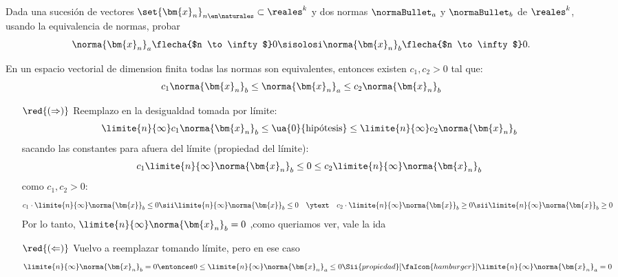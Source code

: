 \begin{enunciado}{\ejercicio}
  Dada una sucesión de vectores $\set{\bm{x}_n}_{n \en \naturales} \subset \reales^k$ y dos normas $\normaBullet_a$ y $\normaBullet_b$ de
  $\reales^k$, usando la equivalencia de normas, probar
  $$
    \norma{\bm{x}_n}_a \flecha{$n \to \infty$} 0
    \sisolosi
    \norma{\bm{x}_n}_b \flecha{$n \to \infty$} 0.
  $$
\end{enunciado}

\medskip

En un espacio vectorial de dimension finita todas las normas son equivalentes, entonces existen $c_1,c_2 > 0$ tal que:
$$
  c_1 \norma{\bm{x}_n}_b
  \leq
  \norma{\bm{x}_n}_a
  \leq
  c_2 \norma{\bm{x}_n}_b
$$

\begin{enumerate}
  \item[$\red{(\Rightarrow)}$]
        Reemplazo en la desigualdad tomada por límite:
        $$
          \limite{n}{\infty} c_1\norma{\bm{x}_n}_b \leq \ua{0}{\text{hipótesis}}
          \leq
          \limite{n}{\infty}  c_2\norma{\bm{x}_n}_b
        $$
        sacando las constantes para afuera del límite (propiedad del límite):
        $$
          c_1 \limite{n}{\infty} \norma{\bm{x}_n}_b \leq 0 \leq  c_2 \limite{n}{\infty} \norma{\bm{x}_n}_b
        $$
        como  $c_1, c_2 > 0$:
        $$
          c_1 \cdot \limite{n}{\infty} \norma{\bm{x}}_b \leq 0
          \sii
          \limite{n}{\infty} \norma{\bm{x}}_b \leq 0
          \quad \ytext \quad
          c_2 \cdot \limite{n}{\infty} \norma{\bm{x}}_b \geq 0
          \sii
          \limite{n}{\infty} \norma{\bm{x}}_b \geq  0
        $$
        Por lo tanto, $\limite{n}{\infty} \norma{\bm{x}_n}_b = 0$ ,como queriamos ver, vale la ida

  \item[$\red{(\Leftarrow)}$]
        Vuelvo a reemplazar tomando límite, pero en ese caso
        $$
          \limite{n}{\infty} \norma{\bm{x}_n}_b = 0
          \entonces
          0 \leq \limite{n}{\infty} \norma{\bm{x}_n}_a \leq 0
          \Sii{propiedad}[\faIcon{hamburger}]
          \limite{n}{\infty} \norma{\bm{x}_n}_a = 0
        $$

\end{enumerate}

\begin{aportes}
  \item {}
  \item {}
\end{aportes}
